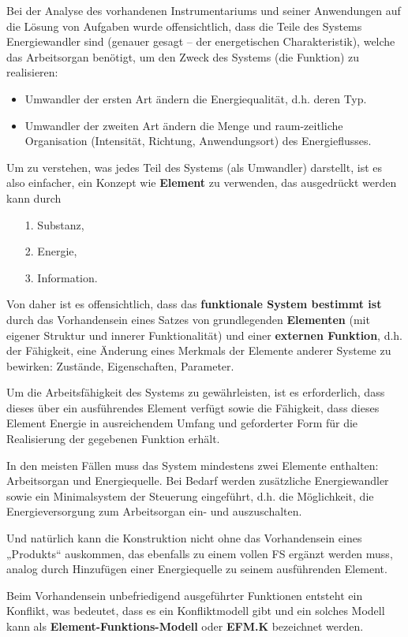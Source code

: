 \documentclass[11pt,a4paper]{article}
\begin{document}
Bei der Analyse des vorhandenen Instrumentariums und seiner Anwendungen auf
die Lösung von Aufgaben wurde offensichtlich, dass die Teile des Systems
Energiewandler sind (genauer gesagt -- der energetischen Charakteristik),
welche das Arbeitsorgan benötigt, um den Zweck des Systems (die Funktion) zu
realisieren:
\begin{itemize}
\item Umwandler der ersten Art ändern die Energiequalität, d.h. deren Typ.
\item Umwandler der zweiten Art ändern die Menge und raum-zeitliche
  Organisation (Intensität, Richtung, Anwendungsort) des Energieflusses.
\end{itemize}
Um zu verstehen, was jedes Teil des Systems (als Umwandler) darstellt, ist es
also einfacher, ein Konzept wie \textbf{Element} zu verwenden, das ausgedrückt
werden kann durch
\begin{itemize}[noitemsep]
\item[1.] Substanz,
\item[2.] Energie,
\item[3.] Information.
\end{itemize}
Von daher ist es offensichtlich, dass das \textbf{funktionale System bestimmt
  ist} durch das Vorhandensein eines Satzes von grundlegenden
\textbf{Elementen} (mit eigener Struktur und innerer Funktionalität) und einer
\textbf{externen Funktion}, d.h. der Fähigkeit, eine Änderung eines Merkmals
der Elemente anderer Systeme zu bewirken: Zustände, Eigenschaften, Parameter.

Um die Arbeitsfähigkeit des Systems zu gewährleisten, ist es erforderlich,
dass dieses über ein ausführendes Element verfügt sowie die Fähigkeit, dass
dieses Element Energie in ausreichendem Umfang und geforderter Form für die
Realisierung der gegebenen Funktion erhält.

In den meisten Fällen muss das System mindestens zwei Elemente enthalten:
Arbeitsorgan und Energiequelle. Bei Bedarf werden zusätzliche Energiewandler
sowie ein Minimalsystem der Steuerung eingeführt, d.h. die Möglichkeit, die
Energieversorgung zum Arbeitsorgan ein- und auszuschalten.

Und natürlich kann die Konstruktion nicht ohne das Vorhandensein eines
„Produkts“ auskommen, das ebenfalls zu einem vollen FS ergänzt werden muss,
analog durch Hinzufügen einer Energiequelle zu seinem ausführenden Element.

Beim Vorhandensein unbefriedigend ausgeführter Funktionen entsteht ein
Konflikt, was bedeutet, dass es ein Konfliktmodell gibt und ein solches Modell
kann als \textbf{Element-Funktions-Modell} oder \textbf{EFM.K} bezeichnet
werden.
\end{document}
